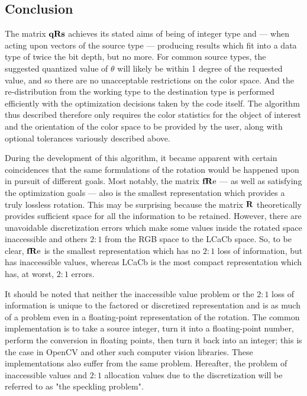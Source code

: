 \subsection{Conclusion}
The matrix $\qRs$ achieves its stated aims of being of integer type and --- when acting upon vectors of the source type --- producing results which fit into a data type of twice the bit depth, but no more. For common source types, the suggested quantized value of $\theta$ will likely be within 1 degree of the requested value, and so there are no unacceptable restrictions on the color space. And the re-distribution from the working type to the destination type is performed efficiently with the optimization decisions taken by the code itself. The algorithm thus described therefore only requires the color statistics for the object of interest and the orientation of the color space to be provided by the user, along with optional tolerances variously described above.

During the development of this algorithm, it became apparent with certain coincidences that the same formulations of the rotation would be happened upon in pursuit of different goals. Most notably, the matrix $\fRe$ --- as well as satisfying the optimization goals --- also is the smallest representation which provides a truly lossless rotation. This may be surprising because the matrix $\R$ theoretically provides sufficient space for all the information to be retained. However, there are unavoidable discretization errors which make some values inside the rotated space inaccessible and others $2:1$ from the RGB space to the LCaCb space. So, to be clear, $\fRe$ is the smallest representation which has no $2:1$ loss of information, but has inaccessible values, whereas LCaCb is the most compact representation which has, at worst, $2:1$ errors. 

It should be noted that neither the inaccessible value problem or the $2:1$ loss of information is unique to the factored or discretized representation and is as much of a problem even in a floating-point representation of the rotation. The common implementation is to take a source integer, turn it into a floating-point number, perform the conversion in floating points, then turn it back into an integer; this is the case in OpenCV and other such computer vision libraries. These implementations also suffer from the same problem. Hereafter, the problem of inaccessible values and $2:1$ allocation values due to the discretization will be referred to as "the speckling problem". 


